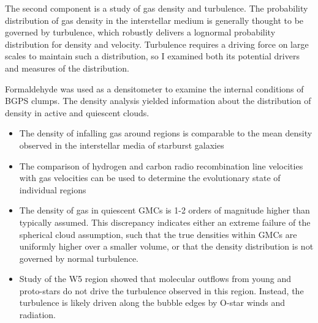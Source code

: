 The second component is a study of gas density and turbulence. The probability
distribution of gas density in the interstellar medium is generally thought to
be governed by turbulence, which robustly delivers a lognormal probability
distribution for density and velocity.  Turbulence requires a driving force on
large scales to maintain such a distribution, so I examined both its potential
drivers and measures of the distribution.

Formaldehyde was used as a densitometer to examine the internal conditions of
BGPS clumps.   The density analysis yielded information about the distribution
of density in active and quiescent clouds.

\begin{itemize}
    \item The density of infalling gas around \uchii regions is comparable to the
        mean density observed in the interstellar media of starburst galaxies
    \item The comparison of hydrogen and carbon radio recombination line
        velocities with \formaldehyde gas velocities can be used to determine
        the evolutionary state of individual \uchii regions
    \item The density of gas in quiescent GMCs is 1-2 orders of magnitude
        higher than typically assumed.  This discrepancy indicates either an
        extreme failure of the spherical cloud assumption, such that the true
        densities within GMCs are uniformly higher over a smaller volume, or
        that the density distribution is not governed by normal turbulence.
    \item Study of the W5 region showed that molecular outflows from young and
        proto-stars do not drive the turbulence observed in this region.  Instead,
        the turbulence is likely driven along the bubble edges by O-star winds and
        radiation.
\end{itemize}






